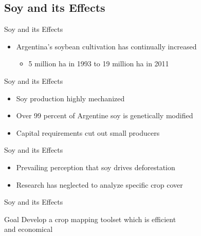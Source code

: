 \documentclass[  compress,xcolor={usenames,dvipsnames}]{beamer}
\begin{document}
\subsection{Soy and its Effects}
\begin{frame}{Soy and its Effects}
\begin{itemize}
  \item Argentina's soybean cultivation has continually increased
  \begin{itemize}
    \item 5 million ha in 1993 to 19 million ha in 2011
  \end{itemize}
\end{itemize}
\end{frame}

\begin{frame}{Soy and its Effects}
\begin{itemize}
  \item<1-> Soy production highly mechanized
  \item<2-> Over 99 percent of Argentine soy is genetically modified
  \item<3-> Capital requirements cut out small producers
\end{itemize}
\end{frame}

\begin{frame}{Soy and its Effects}
\begin{itemize}
  \item<1-> Prevailing perception that soy drives deforestation
  \item<2-> Research has neglected to analyze specific crop cover
\end{itemize}
\end{frame}

\begin{frame}{Soy and its Effects}
\begin{block}{Goal}
  Develop a crop mapping toolset which is efficient\\and economical
\end{block}
\vspace{\baselineskip}
\end{frame}
\end{document}
